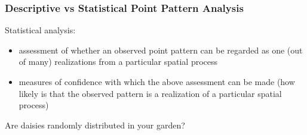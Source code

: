 \documentclass[10pt]{beamer}\usepackage[]{graphicx}\usepackage[]{color}
\newcommand{\bcenter}{\begin{center}}
\newcommand{\ecenter}{\end{center}}
\newcommand{\bfigure}{\begin{figure}}
\newcommand{\efigure}{\end{figure}}
\newcommand{\bblock}{\begin{block}}
\newcommand{\eblock}{\end{block}}
\begin{document}
\begin{frame}
\frametitle{Descriptive vs Statistical Point Pattern Analysis}

\bblock{{Statistical analysis:}}
\begin{itemize}
\item assessment of whether an observed point pattern
can be regarded as one (out of many) realizations from a particular
spatial process
\item measures of confidence with which the above
assessment can be made (how likely is that the observed pattern is a
realization of a particular spatial process)
\end{itemize}
\eblock

\bblock{Are daisies randomly distributed in your garden?}

\bcenter
\bfigure
{}
\efigure
\ecenter
\eblock

\end{frame}
\end{document}
